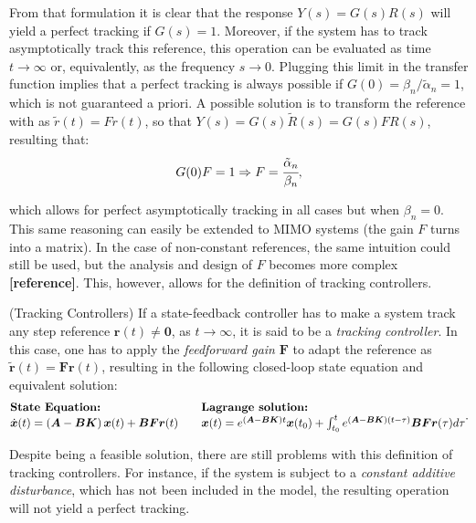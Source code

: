 \documentclass[a4paper,11pt]{book}
\numberwithin{figure}{chapter}
\numberwithin{equation}{chapter}
\numberwithin{table}{chapter}
\theoremstyle{definition}
\newtheorem{definition}{Definition}[chapter]
\newcounter{boxed-theorem}
\newcounter{boxed-definition}
\newenvironment{boxed-definition}[1]
{\colorlet{shadecolor}{pastelYellow!15} \begin{shaded} \begin{definition}{#1}}
{\end{definition} \end{shaded}}
\newcounter{boxed-example}
\begin{document}
From that formulation it is clear that the response $Y(s) = G(s)R(s)$ will yield a perfect tracking if $G(s) = 1$. Moreover, if the system has to track asymptotically track this reference, this operation can be evaluated as time $t \to \infty$ or, equivalently, as the frequency $s \to 0$. Plugging this limit in the transfer function implies that a perfect tracking is always possible if $G(0) = \beta_n /  \tilde{\alpha}_n = 1$, which is not guaranteed a priori. A possible solution is to transform the reference with as $\tilde{r}(t) = F r(t)$, so that $Y(s) = G(s)\tilde{R}(s) = G(s) F R(s)$, resulting that:
\begin{equation}
    G(0) F = 1 \Rightarrow F = \cfrac{\tilde{\alpha}_n}{\beta_n}
,\end{equation}

\noindent which allows for perfect asymptotically tracking in all cases but when $\beta_n = 0$. This same reasoning can easily be extended to MIMO systems (the gain $F$ turns into a matrix). In the case of non-constant references, the same intuition could still be used, but the analysis and design of $F$ becomes more complex \textbf{[reference]}. This, however, allows for the definition of tracking controllers.

\begin{boxed-definition}{(Tracking Controllers)} \label{def:tracking}
    If a state-feedback controller has to make a system track any step reference $\bm{r}(t) \neq \bm{0}$, as $t \to \infty$, it is said to be a \textit{tracking controller}. In this case, one has to apply the \textit{feedforward gain} $\bm{F}$ to adapt the reference as $\tilde{\bm{r}}(t) = \bm{F}\bm{r}(t)$, resulting in the following closed-loop state equation and equivalent solution:
    \begin{align}
    \begin{matrix*}[l]
    \textbf{State Equation:} \hfill & & \textbf{Lagrange solution:} \hfill \\
    \dot{\bm{x}}(t) = \left( \bm{A} - \bm{B} \bm{K} \right) \bm{x}(t) + \bm{B} \bm{F} \bm{r}(t)  & &
    \bm{x}(t) = e^{(\bm{A} - \bm{B} \bm{K}) t} \bm{x}(t_0) + \int_{t_0}^{t} e^{(\bm{A} - \bm{B} \bm{K}) (t - \tau)} \bm{B} \bm{F} \bm{r}(\tau) d \tau \hfill
    \end{matrix*}
    .\end{align}
\end{boxed-definition}

Despite being a feasible solution, there are still problems with this definition of tracking controllers. For instance, if the system is subject to a \textit{constant additive disturbance}, which has not been included in the model, the resulting operation will not yield a perfect tracking. 
\end{document}
